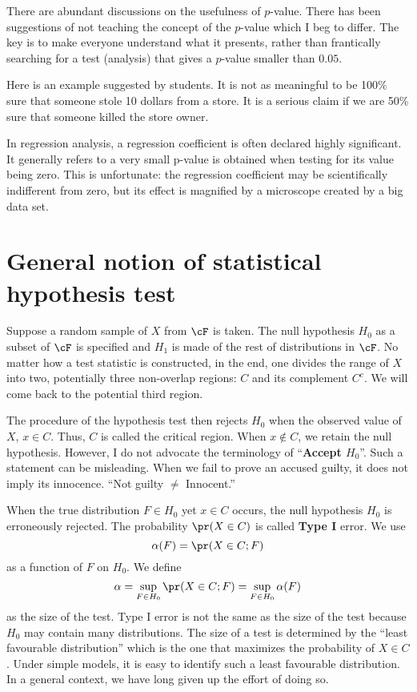 There are abundant discussions on the usefulness of $p$-value.
There has been suggestions of not teaching the concept of 
the $p$-value which I beg to differ. The key is to make
everyone understand what it presents, rather than frantically
searching for a test (analysis) that gives a $p$-value smaller than $0.05$.

Here is an example suggested by students. It is not as meaningful
to be 100\% sure that someone stole 10 dollars from a store.
It is a serious claim if we are 50\% sure that someone killed the
store owner.

In regression analysis, a regression coefficient
is often declared highly significant. It generally refers to
a very small p-value is obtained when testing for its value
being zero. This is unfortunate: the regression coefficient
may be scientifically indifferent from zero,
but its effect is magnified by a microscope created
by a big data set.

\section{General notion of statistical hypothesis test}
Suppose a random sample of $X$ from $\cF$ is taken.
The null hypothesis $H_0$ as a subset of $\cF$ is specified
and $H_1$ is made of the rest of distributions in $\cF$.
No matter how a test statistic is constructed, in the end,
one divides the range of $X$ into two, potentially three
non-overlap regions: $C$ and its complement $C^c$. 
We will come back to the potential third region.

The procedure of the hypothesis test then rejects $H_0$ when
the observed value of $X$, $x \in C$. Thus, $C$ is called the
critical region. When $x \not \in C$, we retain the null hypothesis.
However, I do not advocate the terminology of ``{\bf Accept $H_0$}''.
Such a statement can be misleading. When we fail to prove an accused
guilty, it does not imply its innocence. ``Not guilty $\neq$ Innocent.''

When the true distribution $F \in H_0$ yet $x \in C$ occurs,
the null hypothesis $H_0$ is erroneously rejected. The probability
$\pr(X \in C)$ is called {\bf Type I} error. We use
\[
\alpha(F)  = \pr( X \in C; F)
\]
as a function of $F$ on $H_0$. 
We define
\[
\alpha = \sup_{F \in H_0} \pr( X \in C; F) = \sup_{F \in H_0} \alpha(F)
\]
as the size of the test. Type I error is not
the same as the size of the test because $H_0$ may contain
many distributions. The size of a test is determined by the
``least favourable distribution'' which is the one that maximizes
the probability of $X \in C$. Under simple models, it is easy
to identify such a least favourable distribution. In a general
context, we have long given up the effort of doing so.

